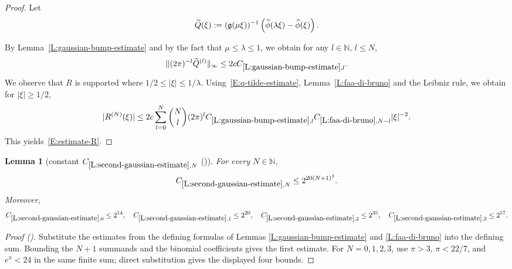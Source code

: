 \documentclass[12pt,reqno]{amsart}
\newcommand{\auto}{{({\tiny\faCar})}}
\theoremstyle{plain}
\newtheorem{lemma}[theorem]{Lemma}
\numberwithin{equation}{section}
\theoremstyle{remark}
\newcommand{\using}[1]{}
\newcommand{\N}{{\mathbb N}}
\newcommand{\ls}[1]{{\color{red}{[L: #1]}}}
\newcommand{\ct}[1]{{\color{magenta}{[C: #1]}}}
\newcommand{\jr}[1]{{\color{orange}{[J: #1]}}}
\begin{document}
\begin{proof}
Let
\[
\widetilde{Q}(\xi):=(\mathfrak{g}(\mu\xi))^{-1}\left(\widehat{\phi}(\lambda\xi)-\widehat{\phi}(\xi)\right).
\]


By Lemma~\ref{L:gaussian-bump-estimate} and by the fact that $\mu \leq \lambda \leq 1$, we obtain for any $l\in \mathbb N$, $l\leq N$,
\begin{equation}\label{E:q-tilde-estimate}
\|(2\pi)^{-l}\widetilde{Q}^{(l)}\|_{\infty} \leq 2c C_{\ref{L:gaussian-bump-estimate},l}.
\end{equation}
We observe that $R$ is supported where $1/2\le|\xi|\le1/\lambda$.
Using~\eqref{E:q-tilde-estimate}, Lemma~\ref{L:faa-di-bruno} and the Leibniz rule, we obtain for $|\xi|\geq 1/2$,
\[
|R^{(N)}(\xi)| \leq 2c\sum_{l=0}^N \binom{N}{l} (2\pi)^l C_{\ref{L:gaussian-bump-estimate},l} C_{\ref{L:faa-di-bruno},N-l} |\xi|^{-2}.
\]
This yields~\eqref{E:estimate-R}.
\end{proof}

\begin{lemma}[constant $C_{\ref{L:second-gaussian-estimate},N}$ \auto]\label{constant second gaussian estimate}\using{L:gaussian-bump-estimate}\using{L:faa-di-bruno}
For every $N\in\N$,
\begin{equation}\label{constant second gaussian estimate bound}
C_{\ref{L:second-gaussian-estimate},N}\le2^{20(N+1)^3}.
\end{equation}
Moreover,
\begin{equation}\label{auto:constant-second-gaussian-estimate-small}
C_{\ref{L:second-gaussian-estimate},0}\le2^{14},
\quad
C_{\ref{L:second-gaussian-estimate},1}\le2^{20},
\quad
C_{\ref{L:second-gaussian-estimate},2}\le2^{35},
\quad
C_{\ref{L:second-gaussian-estimate},3}\le2^{57}.
\end{equation}
\end{lemma}
\begin{proof}[Proof \auto]
Substitute the estimates from the defining formulas of Lemmas \ref{L:gaussian-bump-estimate} and \ref{L:faa-di-bruno} into the defining sum. Bounding the $N+1$ summands and the binomial coefficients gives the first estimate. For $N=0,1,2,3$, use $\pi>3$, $\pi<22/7$, and $e^\pi<24$ in the same finite sum; direct substitution gives the displayed four bounds.
\end{proof}


\jr{Need this also for other than the standard bump function $\Phi$ (in reduction section)}
\ls{I changed the assumptions on $\Phi$ (now called $\phi$ since it is no longer the standard bump) to just reflect what is needed. It seems that in applications, $\phi$ is either the standard bump or a window.}
\ct{or maybe neither, as the stadnard bump definition may change
and likewise the window.}
\end{document}
